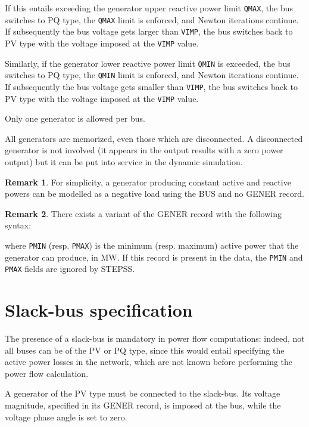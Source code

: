 If this entails exceeding the generator upper reactive power limit {\tt QMAX}, the bus switches to PQ type, the {\tt QMAX} limit is enforced, and Newton iterations continue. If subsequently the bus voltage gets larger than {\tt VIMP}, the bus switches back to PV type with the voltage imposed at the {\tt VIMP} value.

Similarly, if the generator lower reactive power limit {\tt QMIN} is exceeded, the bus switches to PQ type, the {\tt QMIN} limit is enforced, and Newton iterations continue. If subsequently the bus voltage gets smaller than {\tt VIMP}, the bus switches back to PV type with the voltage imposed at the {\tt VIMP} value.

Only one generator is allowed per bus.

All generators are memorized, even those which are disconnected. A disconnected generator is not involved  (it appears in the output results with a zero power output) but it can be put into service in the
dynamic simulation.

{\bf \large Remark 1}. For simplicity, a generator producing constant active and reactive powers can be modelled as a negative load using the BUS and no GENER record.

{\bf \large Remark 2}. There exists a variant of the GENER record with the following syntax:

\hspace*{5ex}{\tt GENER NAME BUS P Q V SNOM QMIN QMAX PMIN PMAX BR ;}

where {\tt PMIN} (resp. {\tt PMAX}) is the minimum (resp. maximum) active power that the generator can produce, in MW. If this record is present in the data, the {\tt PMIN} and {\tt PMAX} fields are ignored by STEPSS.


\section{Slack-bus specification}\label{sec-pf-slack}

The presence of a slack-bus is mandatory in power flow computations: indeed, not all buses can be of the PV or PQ type, since this would entail specifying the active power losses in the network, which are not known before performing the power flow calculation.

A generator of the PV type must be connected to the slack-bus. Its voltage magnitude, specified in its GENER record, is imposed at the bus, while the voltage phase angle is set to zero.

